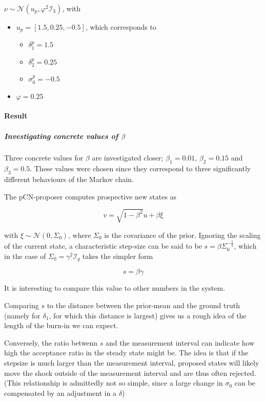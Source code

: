 \documentclass[11pt]{article}
\newcommand{\I}{{\mathcal{I}}}
\newcommand{\N}[2]{\mathcal{N}\left(#1,#2\right)}
\begin{document}
\(\nu \sim \N{u_p}{\varphi^2 \I_3}\), with
\begin{itemize}
\item \(u_p = [1.5, 0.25, -0.5]\),
which corresponds to
\begin{itemize}
\item \(\delta_1^p = 1.5\)
\item \(\delta_2^p = 0.25\)
\item \(\sigma_0^p = -0.5\)
\end{itemize}
\item \(\varphi = 0.25\)
\end{itemize}

\paragraph{Result}
\label{sec:org63a1724}

\subparagraph{Investigating concrete values of \(\beta\)}
\label{sec:org31560dd}

Three concrete values for \(\beta\) are investigated closer; \(\beta_1 = 0.01\), \(\beta_2 = 0.15\)
and \(\beta_3 = 0.5\). These values were chosen since they correspond to three significantly
different behaviours of the Markov chain.

The pCN-proposer computes prospective new states as

$$v = \sqrt{1-\beta^2} u + \beta \xi$$

with \(\xi \sim \N{0}{\Sigma_0}\), where \(\Sigma_0\) is the covariance of the prior. Ignoring the
scaling of the current state, a characteristic step-size can be said to be \(s = \beta \Sigma_0^{-\frac{1}{2}}\),
which in the case of \(\Sigma_0 = \gamma^2 \I_q\) takes the simpler form

\begin{equation}
\label{eqn:char_step}
  s = \beta \gamma
\end{equation}

It is interesting to compare this value to other numbers in the system.

Comparing \(s\) to the distance between the prior-mean and the ground truth (namely for \(\delta_{\text{1}}\),
for which this distance is largest) gives us a rough idea of the length of the burn-in we
can expect.

Conversely, the ratio betwenn \(s\) and the measurement interval can indicate how high the acceptance
ratio in the steady state might be.
The idea is that if the stepsize is much larger than the measurement interval, proposed states will
likely move the shock outside of the measurement interval and are thus often rejected. (This
relationship is admittedly not so simple, since a large change in \(\sigma_{\text{0}}\) can be compensated
by an adjustment in a \(\delta\))
\end{document}
